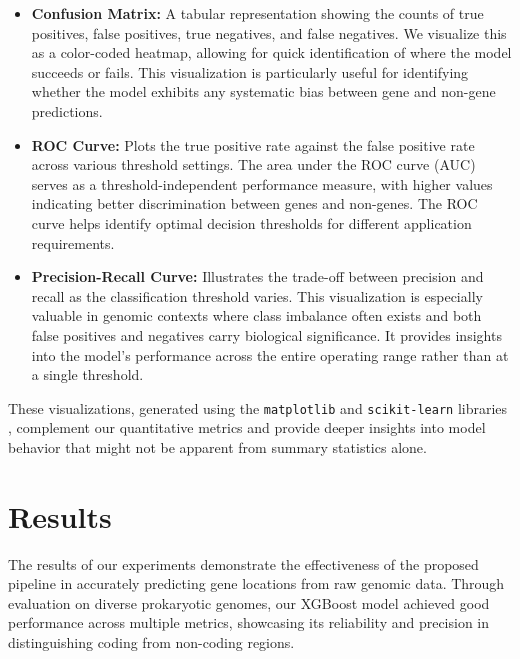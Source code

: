 \documentclass[
	a4paper, %
	10pt, %
	unnumberedsections, %
	twoside, %
]{LTJournalArticle}
\begin{document}
\begin{itemize}
    \item \textbf{Confusion Matrix:} A tabular representation showing the counts of true positives, false positives, true negatives, and false negatives. We visualize this as a color-coded heatmap, allowing for quick identification of where the model succeeds or fails. This visualization is particularly useful for identifying whether the model exhibits any systematic bias between gene and non-gene predictions.
    
    \item \textbf{ROC Curve:} Plots the true positive rate against the false positive rate across various threshold settings. The area under the ROC curve (AUC) serves as a threshold-independent performance measure, with higher values indicating better discrimination between genes and non-genes. The ROC curve helps identify optimal decision thresholds for different application requirements.
    
    \item \textbf{Precision-Recall Curve:} Illustrates the trade-off between precision and recall as the classification threshold varies. This visualization is especially valuable in genomic contexts where class imbalance often exists and both false positives and negatives carry biological significance. It provides insights into the model's performance across the entire operating range rather than at a single threshold.
\end{itemize}

These visualizations, generated using the \texttt{matplotlib} and \texttt{scikit-learn} libraries \cite{Pedregosa:2011}, complement our quantitative metrics and provide deeper insights into model behavior that might not be apparent from summary statistics alone.


\section{Results}

The results of our experiments demonstrate the effectiveness of the proposed pipeline in accurately predicting gene locations from raw genomic data. Through evaluation on diverse prokaryotic genomes, our XGBoost model achieved good performance across multiple metrics, showcasing its reliability and precision in distinguishing coding from non-coding regions.
\end{document}
